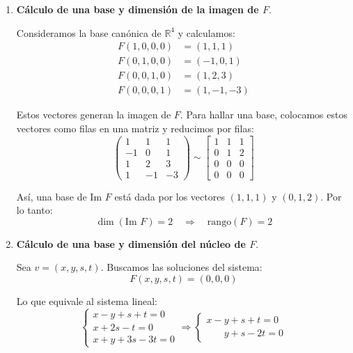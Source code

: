 \begin{enumerate}[label=\alph*.]

  \item \textbf{Cálculo de una base y dimensión de la imagen de \(F\)}.

  Consideramos la base canónica de \(\mathbb{R}^4\) y calculamos:
  \[
  \begin{aligned}
    F(1,0,0,0) &= (1,1,1) \\
    F(0,1,0,0) &= (-1,0,1) \\
    F(0,0,1,0) &= (1,2,3) \\
    F(0,0,0,1) &= (1,-1,-3)
  \end{aligned}
  \]

  Estos vectores generan la imagen de \(F\). Para hallar una base, colocamos estos vectores como filas en una matriz y reducimos por filas:
  \[
  \begin{pmatrix}
    1 & 1 & 1 \\
    -1 & 0 & 1 \\
    1 & 2 & 3 \\
    1 & -1 & -3
  \end{pmatrix}
  \sim
  \begin{bmatrix}
    1 & 1 & 1 \\
    0 & 1 & 2 \\
    0 & 0 & 0 \\
    0 & 0 & 0
  \end{bmatrix}
  \]

  Así, una base de \(\text{Im } F\) está dada por los vectores \((1,1,1)\) y \((0,1,2)\). Por lo tanto:
  \[
    \dim(\text{Im } F) = 2 \quad \Rightarrow \quad \text{rango}(F) = 2
  \]

  \item \textbf{Cálculo de una base y dimensión del núcleo de \(F\)}.

  Sea \(v = (x,y,s,t)\). Buscamos las soluciones del sistema:
  \[
    F(x,y,s,t) = (0,0,0)
  \]

  Lo que equivale al sistema lineal:
  \[
  \begin{cases}
    x - y + s + t = 0 \\
    x + 2s - t = 0 \\
    x + y + 3s - 3t = 0
  \end{cases}
  \Rightarrow
  \begin{cases}
    x - y + s + t = 0\\
    \phantom{x+} y + s - 2t = 0
  \end{cases}
  \]


\end{enumerate}
